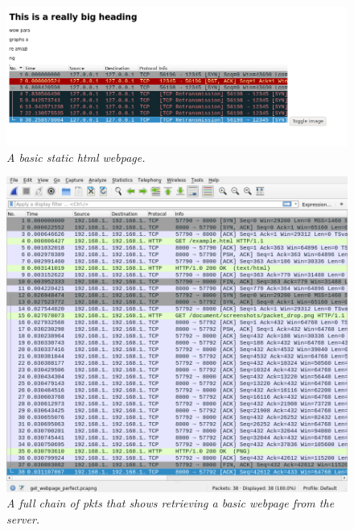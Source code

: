 \documentclass[titlepage]{article}
\begin{document}
\begin{figure}[H]
  \centering
  \begin{framed}
  \includegraphics[width=\textwidth]{basic_webpage.png}
  \end{framed}
    \caption{\textit{%
    A basic static \gls{html} webpage.
}}\label{basicwebpage}
\end{figure}

\begin{figure}[H]
  \centering
  \includegraphics[width=\textwidth]{website_get.png}
    \caption{\textit{%
    A full chain of \glspl{pkt} that shows retrieving a basic webpage
    from the server.
}}\label{getrequest}
\end{figure}
\end{document}
